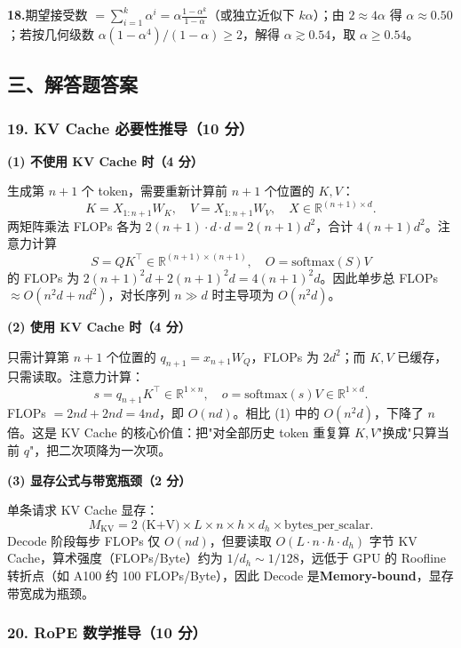 \documentclass[11pt,a4paper]{article}
\begin{document}
\noindent\textbf{18.}\quad 期望接受数 $= \sum_{i=1}^{k}\alpha^{i} = \alpha\frac{1-\alpha^k}{1-\alpha}$（或独立近似下 $k\alpha$）\quad ；\quad 由 $2 \approx 4\alpha$ 得 $\alpha \approx 0.50$；若按几何级数 $\alpha(1-\alpha^4)/(1-\alpha)\geq 2$，解得 $\alpha\gtrsim 0.54$，取 $\boxed{\alpha\geq 0.54}$。

\subsection*{\heiti 三、解答题答案}

\subsubsection*{19. KV Cache 必要性推导（10 分）}

\noindent\textbf{(1) 不使用 KV Cache 时（4 分）}

生成第 $n+1$ 个 token，需要重新计算前 $n+1$ 个位置的 $K,V$：
\[
K = X_{1:n+1} W_K,\quad V = X_{1:n+1} W_V,\quad X\in\mathbb{R}^{(n+1)\times d}.
\]
两矩阵乘法 FLOPs 各为 $2(n+1)\cdot d\cdot d = 2(n+1)d^2$，合计 $4(n+1)d^2$。注意力计算
\[
S=QK^{\top}\in\mathbb{R}^{(n+1)\times(n+1)},\quad O=\mathrm{softmax}(S)V
\]
的 FLOPs 为 $2(n+1)^2 d + 2(n+1)^2 d = 4(n+1)^2 d$。因此单步总 FLOPs $\approx O(n^2 d + nd^2)$，对长序列 $n\gg d$ 时主导项为 $O(n^2 d)$。

\noindent\textbf{(2) 使用 KV Cache 时（4 分）}

只需计算第 $n+1$ 个位置的 $q_{n+1}=x_{n+1}W_Q$，FLOPs 为 $2d^2$；而 $K,V$ 已缓存，只需读取。注意力计算：
\[
s = q_{n+1} K^{\top}\in\mathbb{R}^{1\times n},\quad o=\mathrm{softmax}(s)V\in\mathbb{R}^{1\times d}.
\]
FLOPs $= 2nd + 2nd = 4nd$，即 $O(nd)$。相比 (1) 中的 $O(n^2 d)$，下降了 $n$ 倍。这是 KV Cache 的核心价值：把"对全部历史 token 重复算 $K,V$"换成"只算当前 $q$"，把二次项降为一次项。

\noindent\textbf{(3) 显存公式与带宽瓶颈（2 分）}

单条请求 KV Cache 显存：
\[
M_{\text{KV}} = 2 \text{ (K+V)}\times L\times n\times h\times d_h \times \text{bytes\_per\_scalar}.
\]
Decode 阶段每步 FLOPs 仅 $O(nd)$，但要读取 $O(L\cdot n\cdot h\cdot d_h)$ 字节 KV Cache，算术强度（FLOPs/Byte）约为 $1/d_h\sim 1/128$，远低于 GPU 的 Roofline 转折点（如 A100 约 100 FLOPs/Byte），因此 Decode 是\textbf{Memory-bound}，显存带宽成为瓶颈。

\subsubsection*{20. RoPE 数学推导（10 分）}
\end{document}

